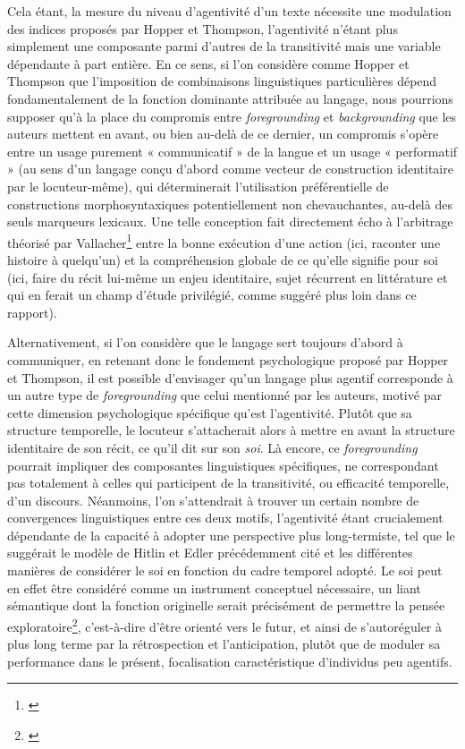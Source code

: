 Cela étant, la mesure du niveau d’agentivité d’un texte nécessite une modulation des indices proposés par Hopper et Thompson, l’agentivité n'étant plus simplement une composante parmi d'autres de la transitivité mais une variable dépendante à part entière. En ce sens, si l’on considère comme Hopper et Thompson que l'imposition de combinaisons linguistiques particulières dépend fondamentalement de la fonction dominante attribuée au langage, nous pourrions supposer qu’à la place du compromis entre \textit{foregrounding} et \textit{backgrounding} que les auteurs mettent en avant, ou bien au-delà de ce dernier, un compromis s’opère entre un usage purement « communicatif » de la langue et un usage « performatif » (au sens d’un langage conçu d’abord comme vecteur de construction identitaire par le locuteur-même), qui déterminerait l'utilisation préférentielle de constructions morphosyntaxiques potentiellement non chevauchantes, au-delà des seuls marqueurs lexicaux. Une telle conception fait directement écho à l'arbitrage théorisé par Vallacher\footnote{\cite{vallacher_levels_1989}} entre la bonne exécution d'une action (ici, raconter une histoire à quelqu’un) et la compréhension globale de ce qu'elle signifie pour soi (ici, faire du récit lui-même un enjeu identitaire, sujet récurrent en littérature et qui en ferait un champ d'étude privilégié, comme suggéré plus loin dans ce rapport).

Alternativement, si l'on considère que le langage sert toujours d’abord à communiquer, en retenant donc le fondement psychologique proposé par Hopper et Thompson, il est possible d'envisager qu’un langage plus agentif corresponde à un autre type de \textit{foregrounding} que celui mentionné par les auteurs, motivé par cette dimension psychologique spécifique qu’est l’agentivité. Plutôt que sa structure temporelle, le locuteur s’attacherait alors à mettre en avant la structure identitaire de son récit, ce qu'il dit sur son \textit{soi}. Là encore, ce \textit{foregrounding} pourrait impliquer des composantes linguistiques spécifiques, ne correspondant pas totalement à celles qui participent de la transitivité, ou efficacité temporelle, d’un discours. Néanmoins, l’on s’attendrait à trouver un certain nombre de convergences linguistiques entre ces deux motifs, l’agentivité étant crucialement dépendante de la capacité à adopter une perspective plus long-termiste, tel que le suggérait le modèle de Hitlin et Edler précédemment cité et les différentes manières de considérer le soi en fonction du cadre temporel adopté. Le soi peut en effet être considéré comme un instrument conceptuel nécessaire, un liant sémantique dont la fonction originelle serait précisément de permettre la pensée exploratoire\footnote{\cite{hills_foraging_2015}}, c'est-à-dire d'être orienté vers le futur, et ainsi de s’autoréguler à plus long terme par la rétrospection et l'anticipation, plutôt que de moduler sa performance dans le présent, focalisation caractéristique d’individus peu agentifs.

